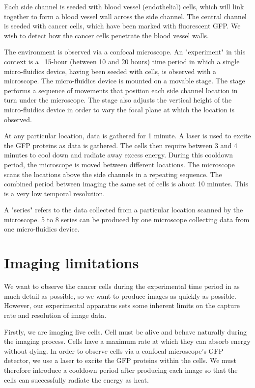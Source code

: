 Each side channel is seeded with blood vessel (endothelial) cells, which will link together to form a blood vessel wall across the side channel. The central channel is seeded with cancer cells, which have been marked with fluorescent GFP. We wish to detect how the cancer cells penetrate the blood vessel walls.

The environment is observed via a confocal microscope. An "experiment" in this context is a ~15-hour (between 10 and 20 hours) time period in which a single micro-fluidics device, having been seeded with cells, is observed with a microscope. The micro-fluidics device is mounted on a movable stage. The stage performs a sequence of movements that position each side channel location in turn under the microscope. The stage also adjusts the vertical height of the micro-fluidics device in order to vary the focal plane at which the location is observed.

At any particular location, data is gathered for 1 minute. A laser is used to excite the GFP proteins as data is gathered. The cells then require between 3 and 4 minutes to cool down and radiate away excess energy. During this cooldown period, the microscope is moved between different locations. The microscope scans the locations above the side channels in a repeating sequence. The combined period between imaging the same set of cells is about 10 minutes. This is a very low temporal resolution.

A "series" refers to the data collected from a particular location scanned by the microscope. 5 to 8 series can be produced by one microscope collecting data from one micro-fluidics device.

\section{Imaging limitations}

We want to observe the cancer cells during the experimental time period in as much detail as possible, so we want to produce images as quickly as possible. However, our experimental apparatus sets some inherent limits on the capture rate and resolution of image data.

Firstly, we are imaging live cells. Cell must be alive and behave naturally during the imaging process. Cells have a maximum rate at which they can absorb energy without dying. In order to observe cells via a confocal microscope's GFP detector, we use a laser to excite the GFP proteins within the cells. We must therefore introduce a cooldown period after producing each image so that the cells can successfully radiate the energy as heat.

